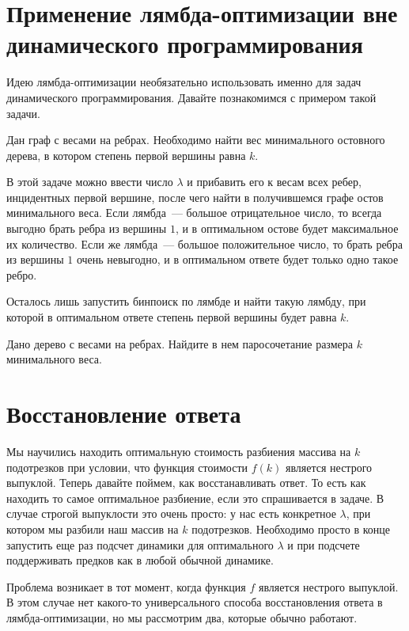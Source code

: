 \section{Применение лямбда-оптимизации вне динамического программирования}

Идею лямбда-оптимизации необязательно использовать именно для задач динамического программирования. Давайте познакомимся с примером такой задачи.

\begin{problem}
    Дан граф с весами на ребрах. Необходимо найти вес минимального остовного дерева, в котором степень первой вершины равна $k$.
\end{problem}

В этой задаче можно ввести число $\lambda$ и прибавить его к весам всех ребер, инцидентных первой вершине, после чего найти в получившемся графе остов минимального веса. Если лямбда~--- большое отрицательное число, то всегда выгодно брать ребра из вершины $1$, и в оптимальном остове будет максимальное их количество. Если же лямбда~--- большое положительное число, то брать ребра из вершины $1$ очень невыгодно, и в оптимальном ответе будет только одно такое ребро.

Осталось лишь запустить бинпоиск по лямбде и найти такую лямбду, при которой в оптимальном ответе степень первой вершины будет равна $k$.

\begin{exercise}
    Дано дерево с весами на ребрах. Найдите в нем паросочетание размера $k$ минимального веса.
\end{exercise}

\section{Восстановление ответа}

Мы научились находить оптимальную стоимость разбиения массива на $k$ подотрезков при условии, что функция стоимости $f(k)$ является нестрого выпуклой. Теперь давайте поймем, как восстанавливать ответ. То есть как находить то самое оптимальное разбиение, если это спрашивается в задаче. В случае строгой выпуклости это очень просто: у нас есть конкретное $\lambda$, при котором мы разбили наш массив на $k$ подотрезков. Необходимо просто в конце запустить еще раз подсчет динамики для оптимального $\lambda$ и при подсчете поддерживать предков как в любой обычной динамике.

Проблема возникает в тот момент, когда функция $f$ является нестрого выпуклой. В этом случае нет какого-то универсального способа восстановления ответа в лямбда-оптимизации, но мы рассмотрим два, которые обычно работают.

